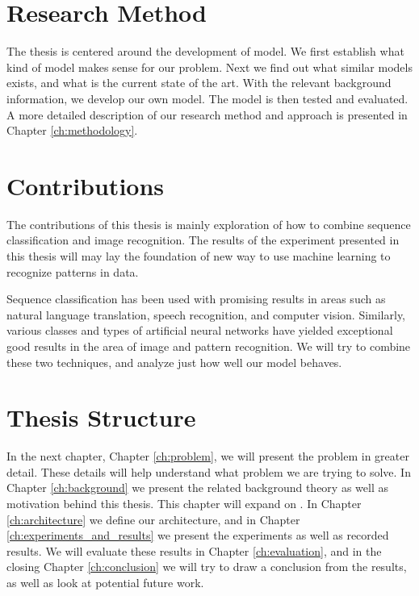 
\section{Research Method}
The thesis is centered around the development of model. We first establish what kind of model makes sense for our problem. Next we find out what similar models exists, and what is the current state of the art. With the relevant background information, we develop our own model. The model is then tested and evaluated. A more detailed description of our research method and approach is presented in Chapter \ref{ch:methodology}.


\section{Contributions}
The contributions of this thesis is mainly exploration of how to combine sequence classification and image recognition. The results of the experiment presented in this thesis will may lay the foundation of new way to use machine learning to recognize patterns in data.

Sequence classification has been used with promising results in areas such as natural language translation, speech recognition, and computer vision. Similarly, various classes and types of artificial neural networks have yielded exceptional good results in the area of image and pattern recognition. We will try to combine these two techniques, and analyze just how well our model behaves.



\section{Thesis Structure}
In the next chapter, Chapter \ref{ch:problem}, we will present the problem in greater detail. These details will help understand what problem we are trying to solve. In Chapter \ref{ch:background} we present the related background theory as well as motivation behind this thesis. This chapter will expand on . In Chapter \ref{ch:architecture} we define our architecture, and in Chapter \ref{ch:experiments_and_results} we present the experiments as well as recorded results. We will evaluate these results in Chapter \ref{ch:evaluation}, and in the closing Chapter \ref{ch:conclusion} we will try to draw a conclusion from the results, as well as look at potential future work.